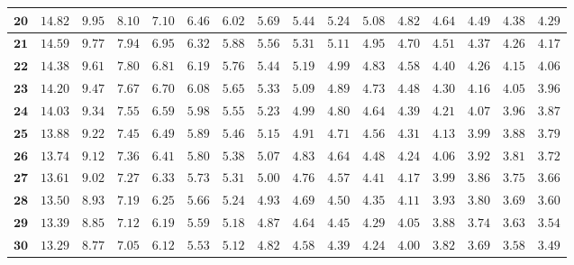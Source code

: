\begin{longtable}{|r|r|r|r|r|r|r|r|r|r|r|r|r|r|r|r|}
    \(\mathbf{20}\) & \(14.82\) & \(9.95\) & \(8.10\) & \(7.10\) & \(6.46\) & \(6.02\) & \(5.69\) & \(5.44\) & \(5.24\) & \(5.08\) & \(4.82\) & \(4.64\) & \(4.49\) & \(4.38\) & \(4.29\) \\ \hline 
    \(\mathbf{21}\) & \(14.59\) & \(9.77\) & \(7.94\) & \(6.95\) & \(6.32\) & \(5.88\) & \(5.56\) & \(5.31\) & \(5.11\) & \(4.95\) & \(4.70\) & \(4.51\) & \(4.37\) & \(4.26\) & \(4.17\) \\ \hline 
    \(\mathbf{22}\) & \(14.38\) & \(9.61\) & \(7.80\) & \(6.81\) & \(6.19\) & \(5.76\) & \(5.44\) & \(5.19\) & \(4.99\) & \(4.83\) & \(4.58\) & \(4.40\) & \(4.26\) & \(4.15\) & \(4.06\) \\ \hline 
    \(\mathbf{23}\) & \(14.20\) & \(9.47\) & \(7.67\) & \(6.70\) & \(6.08\) & \(5.65\) & \(5.33\) & \(5.09\) & \(4.89\) & \(4.73\) & \(4.48\) & \(4.30\) & \(4.16\) & \(4.05\) & \(3.96\) \\ \hline 
    \(\mathbf{24}\) & \(14.03\) & \(9.34\) & \(7.55\) & \(6.59\) & \(5.98\) & \(5.55\) & \(5.23\) & \(4.99\) & \(4.80\) & \(4.64\) & \(4.39\) & \(4.21\) & \(4.07\) & \(3.96\) & \(3.87\) \\ \hline 
    \(\mathbf{25}\) & \(13.88\) & \(9.22\) & \(7.45\) & \(6.49\) & \(5.89\) & \(5.46\) & \(5.15\) & \(4.91\) & \(4.71\) & \(4.56\) & \(4.31\) & \(4.13\) & \(3.99\) & \(3.88\) & \(3.79\) \\ \hline 
    \(\mathbf{26}\) & \(13.74\) & \(9.12\) & \(7.36\) & \(6.41\) & \(5.80\) & \(5.38\) & \(5.07\) & \(4.83\) & \(4.64\) & \(4.48\) & \(4.24\) & \(4.06\) & \(3.92\) & \(3.81\) & \(3.72\) \\ \hline 
    \(\mathbf{27}\) & \(13.61\) & \(9.02\) & \(7.27\) & \(6.33\) & \(5.73\) & \(5.31\) & \(5.00\) & \(4.76\) & \(4.57\) & \(4.41\) & \(4.17\) & \(3.99\) & \(3.86\) & \(3.75\) & \(3.66\) \\ \hline 
    \(\mathbf{28}\) & \(13.50\) & \(8.93\) & \(7.19\) & \(6.25\) & \(5.66\) & \(5.24\) & \(4.93\) & \(4.69\) & \(4.50\) & \(4.35\) & \(4.11\) & \(3.93\) & \(3.80\) & \(3.69\) & \(3.60\) \\ \hline 
    \(\mathbf{29}\) & \(13.39\) & \(8.85\) & \(7.12\) & \(6.19\) & \(5.59\) & \(5.18\) & \(4.87\) & \(4.64\) & \(4.45\) & \(4.29\) & \(4.05\) & \(3.88\) & \(3.74\) & \(3.63\) & \(3.54\) \\ \hline 
    \(\mathbf{30}\) & \(13.29\) & \(8.77\) & \(7.05\) & \(6.12\) & \(5.53\) & \(5.12\) & \(4.82\) & \(4.58\) & \(4.39\) & \(4.24\) & \(4.00\) & \(3.82\) & \(3.69\) & \(3.58\) & \(3.49\) \\ \hline 

\end{longtable}
